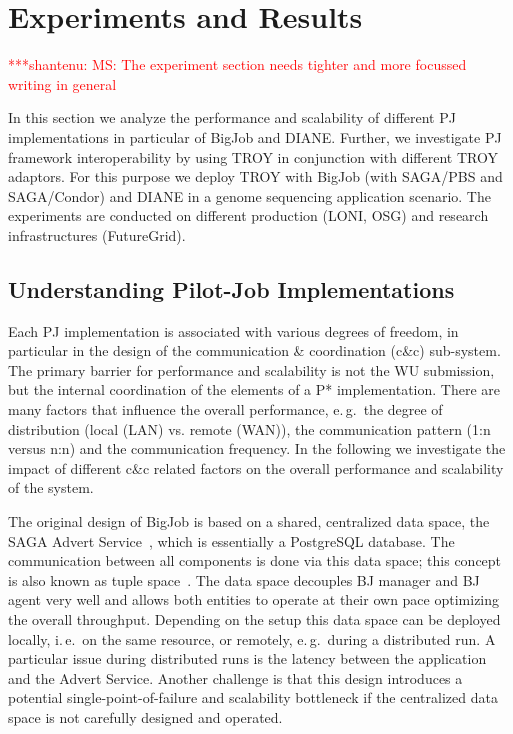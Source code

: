 \documentclass[conference,final]{IEEEtran}
\newcommand{\jhanote}[1]{ {\textcolor{red} { ***shantenu: #1 }}}
\newcommand{\jhanote}[1]{}
\newcommand{\upp}{\vspace*{-0.5em}}
\begin{document}
\upp
\section{Experiments and Results\upp\upp}

\jhanote{MS: The experiment section needs tighter and more focussed
  writing in general}

In this section we analyze the performance and scalability of different PJ
implementations in particular of BigJob and DIANE. Further, we investigate PJ
framework interoperability by using TROY in conjunction with different TROY 
adaptors. For this purpose we deploy TROY with BigJob (with SAGA/PBS and 
SAGA/Condor) and DIANE in a genome sequencing application scenario. The 
experiments are conducted on different production (LONI, OSG) and research
infrastructures (FutureGrid).

\subsection{Understanding Pilot-Job Implementations}

Each PJ implementation is associated with various degrees of freedom, in
particular in the design of the communication \& coordination (c\&c) sub-system.
The primary barrier for performance and scalability is not the WU submission,
but the internal coordination of the elements of a P* implementation. There are
many factors that influence the overall performance, e.\,g.\ the degree of
distribution (local (LAN) vs. remote (WAN)), the communication pattern (1:n
versus n:n) and the communication frequency. In the following we investigate the
impact of different c\&c related factors on the overall performance and
scalability of the system.

The original design of BigJob is based on a shared, centralized data space, the
SAGA Advert Service~\cite{saga_advert}, which is essentially a PostgreSQL
database. The communication between all components is done via this data space;
this concept is also known as tuple space~\cite{Gelernter:1985:GCL:2363.2433}.
The data space decouples BJ manager and BJ agent very well and allows both
entities to operate at their own pace optimizing the overall throughput.
Depending on the setup this data space can be deployed locally, i.\,e.\ on the
same resource, or remotely, e.\,g.\ during a distributed run. A particular issue
during distributed runs is the latency between the application and the Advert
Service. Another challenge is that this design introduces a potential
single-point-of-failure and scalability bottleneck if the centralized data space
is not carefully designed and operated. 
\end{document}
